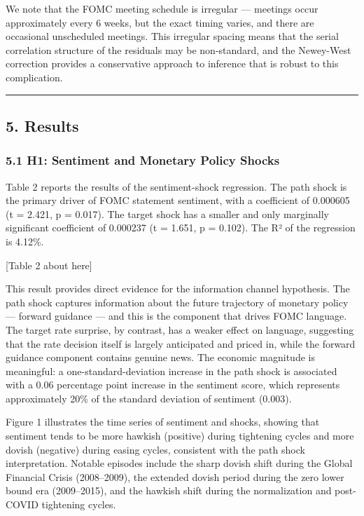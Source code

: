 \documentclass[12pt]{article}
\begin{document}
We note that the FOMC meeting schedule is irregular --- meetings occur
approximately every 6 weeks, but the exact timing varies, and there are
occasional unscheduled meetings. This irregular spacing means that the
serial correlation structure of the residuals may be non-standard, and
the Newey-West correction provides a conservative approach to inference
that is robust to this complication.

\begin{center}\rule{0.5\linewidth}{0.5pt}\end{center}

\subsection{5. Results}\label{results}

\subsubsection{5.1 H1: Sentiment and Monetary Policy
Shocks}\label{h1-sentiment-and-monetary-policy-shocks-1}

Table 2 reports the results of the sentiment-shock regression. The path
shock is the primary driver of FOMC statement sentiment, with a
coefficient of 0.000605 (t = 2.421, p = 0.017). The target shock has a
smaller and only marginally significant coefficient of 0.000237 (t =
1.651, p = 0.102). The R² of the regression is 4.12\%.

{[}Table 2 about here{]}

This result provides direct evidence for the information channel
hypothesis. The path shock captures information about the future
trajectory of monetary policy --- forward guidance --- and this is the
component that drives FOMC language. The target rate surprise, by
contrast, has a weaker effect on language, suggesting that the rate
decision itself is largely anticipated and priced in, while the forward
guidance component contains genuine news. The economic magnitude is
meaningful: a one-standard-deviation increase in the path shock is
associated with a 0.06 percentage point increase in the sentiment score,
which represents approximately 20\% of the standard deviation of
sentiment (0.003).

Figure 1 illustrates the time series of sentiment and shocks, showing
that sentiment tends to be more hawkish (positive) during tightening
cycles and more dovish (negative) during easing cycles, consistent with
the path shock interpretation. Notable episodes include the sharp dovish
shift during the Global Financial Crisis (2008--2009), the extended
dovish period during the zero lower bound era (2009--2015), and the
hawkish shift during the normalization and post-COVID tightening cycles.
\end{document}
